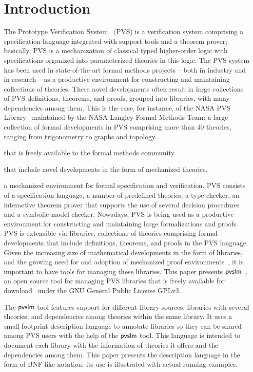 \section{Introduction}
\label{sec.intro}


The Prototype Verification System~\cite{pvs-cade92} (PVS) is a
verification system comprising a specification language integrated
with support tools and a theorem prover; basically, PVS is a
mechanization of classical typed higher-order logic with
specifications organized into parameterized theories in this logic.
The PVS system has been used in state-of-the-art formal methods
projects -- both in industry and in research -- as a productive
environment for constructing and maintaining collections of
theories. These novel developments often result in large collections
of PVS definitions, theorems, and proofs, grouped into libraries, with
many dependencies among them. This is the case, for instance, of the
NASA PVS Library~\cite{nasalib} maintained by the NASA Langley Formal
Methods Team: a large collection of formal developments in PVS
comprising more than 40 theories, ranging from trigonometry to graphs
and topology.




that is
freely available to the formal methods community.



that include novel developments in the form of mechanized theories.



a
mechanized environment for formal specification and verification.  PVS
consists of a specification language, a number of predefined theories,
a type checker, an interactive theorem prover that supports the use of
several decision procedures and a symbolic model checker.  Nowadays,
PVS is being used as a productive environment for constructing and
maintaining large formalizations and proofs. PVS is extensible via
libraries, collections of theories comprising formal developments that
include definitions, theorems, and proofs in the PVS language. Given
the increasing size of mathematical developments in the form of
libraries, and the growing need for and adoption of mechanized proof
environments~\cite{avigad-mech14,hales-proofs14}, it is important to
have tools for managing these libraries. This paper presents
$\textsf{pvslm}$~\cite{pvslm}, an open source tool for managing PVS libraries
that is freely available for download~\cite{pvslm} under the GNU
General Public License GPLv3.

The $\textsf{pvslm}$ tool features support for different library sources,
libraries with several theories, and dependencies among theories
within the same library. It uses a small footprint description
language to annotate libraries so they can be shared among PVS users
with the help of the $\textsf{pvslm}$ tool. This language is intended to
document each library with the information of theories it offers and
the dependencies among them. This paper presents the description
language in the form of BNF-like notation; its use is illustrated with
actual running examples.

